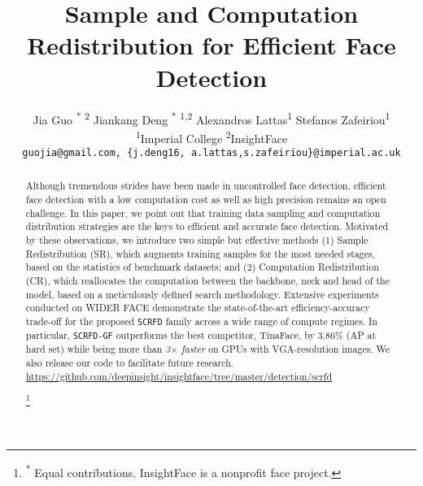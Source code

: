\documentclass[10pt,twocolumn,letterpaper]{article}
\newcommand{\dsname}[1]{\texttt{\small #1}\xspace}
\newcommand{\scrfd}{\dsname{SCRFD}}
\newcommand{\scrfdf}[1]{\dsname{SCRFD-\text{#1}GF}}
\newcommand*{\affaddr}[1]{#1}
\newcommand*{\affmark}[1][*]{\textsuperscript{#1}}
\renewcommand\thefootnote{}
\begin{document}
\title{Sample and Computation Redistribution for Efficient Face Detection}

\author{
Jia Guo \textsuperscript{*} \affmark[2] \qquad 
Jiankang Deng \textsuperscript{*} \affmark[1,2] \qquad
Alexandros Lattas\affmark[1] \qquad Stefanos Zafeiriou\affmark[1]\\
\affaddr{\affmark[1]Imperial College} \qquad
\affaddr{\affmark[2]InsightFace} \qquad \\
{\tt\small guojia@gmail.com, \{j.deng16, a.lattas,s.zafeiriou\}@imperial.ac.uk}
}

\maketitle
\ificcvfinal\thispagestyle{empty}\fi

\begin{abstract}
Although tremendous strides have been made in uncontrolled face detection, efficient face detection with a low computation cost as well as high precision remains an open challenge. In this paper, we point out that training data sampling and computation distribution strategies are the keys to efficient and accurate face detection. Motivated by these observations, we introduce two simple but effective methods (1) Sample Redistribution (SR), which augments training samples for the most needed stages, based on the statistics of benchmark datasets; and (2) Computation Redistribution (CR), which reallocates the computation between the backbone, neck and head of the model, based on a meticulously defined search methodology. Extensive experiments conducted on WIDER FACE demonstrate the state-of-the-art efficiency-accuracy trade-off for the proposed \scrfd family across a wide range of compute regimes. In particular, \scrfdf{34} outperforms the best competitor, TinaFace, by $3.86\%$ (AP at hard set) while being more than \emph{3$\times$ faster} on GPUs with VGA-resolution images. We also release our code to facilitate future research. \url{https://github.com/deepinsight/insightface/tree/master/detection/scrfd}

\footnote{\textsuperscript{*} Equal contributions. 
InsightFace is a nonprofit face project.} 
\setcounter{footnote}{0}
\renewcommand\thefootnote{\arabic{footnote}}
\end{abstract}
\end{document}
